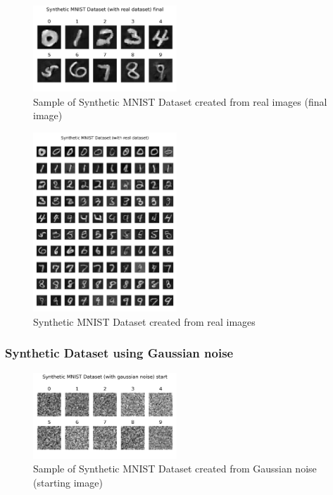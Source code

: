 \documentclass[conference, compsoc]{IEEEtran}
\begin{document}
\begin{figure}[H]
	\centering
	\includegraphics[width=0.48\textwidth]{mnist_real_syn.png}
	\caption{Sample of Synthetic MNIST Dataset created from real images (final image)}
	\label{fig:mnist_real_syn}
\end{figure}

\begin{figure}[H]
	\centering
	\includegraphics[width=0.48\textwidth]{mnist_real_syn_all.png}
	\caption{Synthetic MNIST Dataset created from real images}
	\label{fig:mnist_real_syn_all}
\end{figure}
\subsubsection{Synthetic Dataset using Gaussian noise}
\begin{figure}[H]
	\centering
	\includegraphics[width=0.48\textwidth]{mnist_noise_sample.png}
	\caption{Sample of Synthetic MNIST Dataset created from Gaussian noise (starting image)}
	\label{fig:mnist_noise_sample}
\end{figure}
\end{document}
